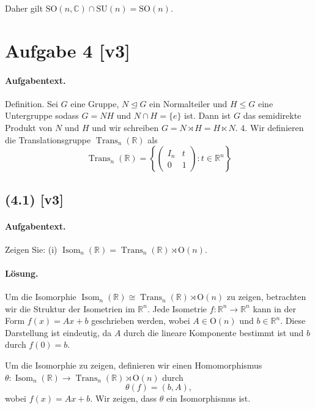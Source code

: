 \documentclass[11pt,a4paper]{article}
\begin{document}
Daher gilt $\mathrm{SO}(n, \mathbb{C}) \cap \mathrm{SU}(n) = \mathrm{SO}(n)$.


\section*{Aufgabe 4 [v3]}
\paragraph{Aufgabentext.}
Definition. Sei $G$ eine Gruppe, $N \unlhd G$ ein Normalteiler und $H \leq G$ eine Untergruppe sodass $G=N H$ und $N \cap H=\{e\}$ ist. Dann ist $G$ das semidirekte Produkt von $N$ und $H$ und wir schreiben $G=N \rtimes H=H \ltimes N$.
4. Wir definieren die Translationsgruppe $\operatorname{Trans}_n(\mathbb{R})$ als
$$
\operatorname{Trans}_n(\mathbb{R})=\left\{\left(\begin{array}{cc}
I_n & t \\
0 & 1
\end{array}\right): t \in \mathbb{R}^n\right\}
$$

\subsection*{(4.1) [v3]}
\paragraph{Aufgabentext.}
Zeigen Sie:
(i) $\operatorname{Isom}_n(\mathbb{R})=\operatorname{Trans}_n(\mathbb{R}) \rtimes \mathrm{O}(n)$.

\paragraph{Lösung.}
Um die Isomorphie $\operatorname{Isom}_n(\mathbb{R}) \cong \operatorname{Trans}_n(\mathbb{R}) \rtimes \mathrm{O}(n)$ zu zeigen, betrachten wir die Struktur der Isometrien im $\mathbb{R}^n$. Jede Isometrie $f: \mathbb{R}^n \to \mathbb{R}^n$ kann in der Form $f(x) = Ax + b$ geschrieben werden, wobei $A \in \mathrm{O}(n)$ und $b \in \mathbb{R}^n$. Diese Darstellung ist eindeutig, da $A$ durch die lineare Komponente bestimmt ist und $b$ durch $f(0) = b$.

Um die Isomorphie zu zeigen, definieren wir einen Homomorphismus $\theta: \operatorname{Isom}_n(\mathbb{R}) \to \operatorname{Trans}_n(\mathbb{R}) \rtimes \mathrm{O}(n)$ durch
\[
\theta(f) = (b, A),
\]
wobei $f(x) = Ax + b$. Wir zeigen, dass $\theta$ ein Isomorphismus ist.
\end{document}
